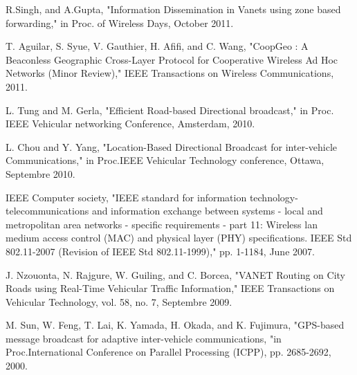 \documentclass{IEEEtran}
\begin{document}
\begin{thebibliography}{1}
R.Singh, and A.Gupta, "Information Dissemination in Vanets using
zone based forwarding," in Proc. of Wireless Days, October 2011.


T. Aguilar, S. Syue, V. Gauthier, H. Afifi, and C.  Wang, "CoopGeo :
A Beaconless Geographic Cross-Layer Protocol for Cooperative
Wireless Ad Hoc Networks (Minor Review)," IEEE Transactions on
Wireless Communications, 2011.

L. Tung and M. Gerla, "Efficient Road-based Directional broadcast,"
in Proc. IEEE Vehicular networking Conference, Amsterdam, 2010.


L. Chou and Y.  Yang, "Location-Based Directional Broadcast for
inter-vehicle Communications," in Proc.IEEE Vehicular Technology
conference, Ottawa, Septembre 2010.


IEEE Computer society, "IEEE standard for information technology-
telecommunications and information exchange between systems - local
and metropolitan area networks - specific requirements - part 11:
Wireless lan medium access control (MAC) and physical layer (PHY)
specifications. IEEE Std 802.11-2007 (Revision of IEEE Std
802.11-1999)," pp. 1-1184, June 2007.

J. Nzouonta, N. Rajgure, W. Guiling, and C. Borcea, "VANET Routing
on City Roads using Real-Time Vehicular Traffic Information," IEEE
Transactions on Vehicular Technology, vol. 58, no. 7, Septembre
2009.

M. Sun, W. Feng, T. Lai, K. Yamada, H. Okada, and K. Fujimura,
"GPS-based message broadcast for adaptive inter-vehicle
communications, "in Proc.International Conference on Parallel
Processing (ICPP), pp. 2685-2692, 2000.

\end{thebibliography}
\end{document}
